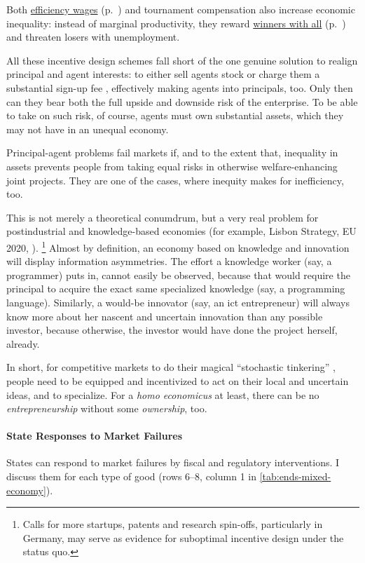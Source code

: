 Both \hyperref[sec:efficiency-wages]{efficiency wages} (p.~\pageref{sec:efficiency-wages}) and tournament compensation also increase economic inequality:
instead of marginal productivity, they reward \hyperref[sec:winner-take-all]{winners with all}  (p.~\pageref{sec:winner-take-all}) and threaten losers with unemployment.

All these incentive design schemes fall short of the one genuine solution to realign principal and agent interests:
to either sell agents stock or charge them a substantial sign-up fee \citep{Tirole2006}, effectively making agents into principals, too.
Only then can they bear both the full upside and downside risk of the enterprise.
To be able to take on such risk, of course, agents must own substantial assets, which they may not have in an unequal economy.

Principal-agent problems fail markets if, and to the extent that, inequality in assets prevents people from taking equal risks in otherwise welfare-enhancing joint projects.
They are one of the cases, where inequity makes for inefficiency, too.

This is not merely a theoretical conumdrum, but a very real problem for postindustrial  and knowledge-based economies (for example, Lisbon Strategy, EU 2020, \citealt{Bell-1973-aa}).
\footnote{
	Calls for more startups, patents and research spin-offs, particularly in Germany, may serve as evidence for suboptimal incentive design under the status quo.
}
Almost by definition, an economy based on knowledge and innovation will display information asymmetries.
The effort a knowledge worker (say, a programmer) puts in, cannot easily be observed, because that would require the principal to acquire the exact same specialized knowledge (say, a programming language).
Similarly, a would-be innovator (say, an \gls{ict} entrepreneur) will always know more about her nascent and uncertain innovation than any possible investor, because otherwise, the investor would have done the project herself, already.

In short, for competitive markets to do their magical ``stochastic tinkering'' \citep[211]{Taleb2007}, people need to be equipped and incentivized to act on their local and uncertain ideas, and to specialize.
For a \emph{homo economicus} at least, there can be no \emph{entrepreneurship} without some \emph{ownership}, too.


\paragraph{State Responses to Market Failures}
	\label{sec:state-responses}
States can respond to market failures by fiscal and regulatory interventions.
I discuss them for each type of good (rows 6--8, column 1 in \autoref{tab:ends-mixed-economy}).

